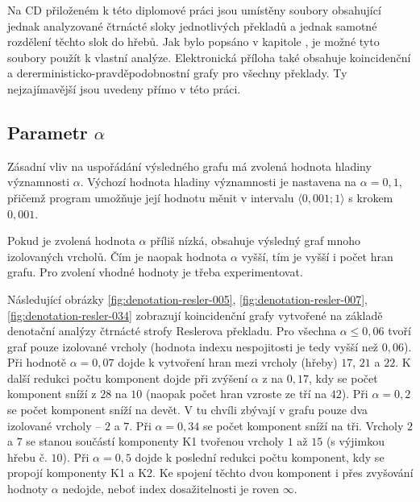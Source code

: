 \documentclass[dp.tex]{subfiles}
\begin{document}
Na CD přiloženém k této diplomové práci jsou umístěny soubory obsahující jednak analyzované čtrnácté sloky jednotlivých překladů a jednak samotné rozdělení těchto slok do hřebů. Jak bylo popsáno v kapitole , je možné tyto soubory použít k vlastní analýze. Elektronická příloha také obsahuje koincidenční a dererministicko-pravděpodobnostní grafy pro všechny překlady. Ty nejzajímavější jsou uvedeny přímo v této práci.

\subsection{Parametr $\alpha$}

Zásadní vliv na uspořádání výsledného grafu má zvolená hodnota hladiny významnosti $\alpha$. Výchozí hodnota hladiny významnosti je nastavena na $\alpha=0{,}1$, přičemž program umožňuje její hodnotu měnit v intervalu $\langle 0{,}001;1\rangle$ s krokem $0{,}001$.

Pokud je zvolená hodnota $\alpha$ příliš nízká, obsahuje výsledný graf mnoho izolovaných vrcholů. Čím je naopak hodnota $\alpha$ vyšší, tím je vyšší i počet hran grafu. Pro zvolení vhodné hodnoty je třeba experimentovat. 

Následující obrázky \ref{fig:denotation-resler-005}, \ref{fig:denotation-resler-007}, \ref{fig:denotation-resler-034}  zobrazují koincidenční grafy vytvořené na základě denotační analýzy čtrnácté strofy Reslerova překladu. Pro všechna $\alpha \leq 0{,}06$ tvoří graf pouze izolované vrcholy (hodnota indexu nespojitosti je tedy vyšší než $0{,}06$). Při hodnotě $\alpha = 0{,}07$ dojde k vytvoření hran mezi vrcholy (hřeby) $17$, $21$ a $22$. K další redukci počtu komponent dojde při zvýšení $\alpha$ z na $0{,}17$, kdy se počet komponent sníží z $28$ na $10$ (naopak počet hran vzroste ze tří na $42$). Při $\alpha = 0{,}2$ se počet komponent sníží na devět. V tu chvíli zbývají v grafu pouze dva izolované vrcholy -- $2$ a $7$. Při $\alpha = 0{,}34$ se počet komponent sníží na tři. Vrcholy $2$ a $7$ se stanou součástí komponenty K1 tvořenou vrcholy $1$ až $15$ (s výjimkou hřebu č. $10$). Při $\alpha = 0{,}5$ dojde k poslední redukci počtu komponent, kdy se propojí komponenty K1 a K2. Ke spojení těchto dvou komponent i přes zvyšování hodnoty $\alpha$ nedojde, neboť index dosažitelnosti je roven $\infty$.
\end{document}
